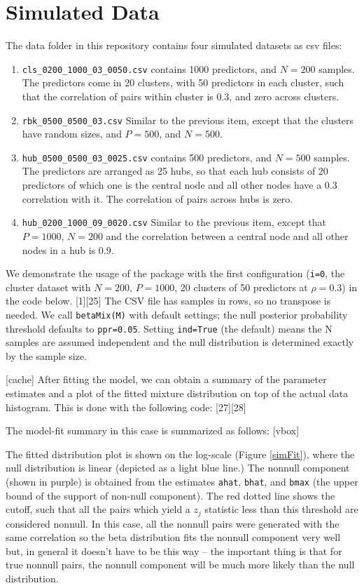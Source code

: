 \documentclass[a4paper,10pt]{article}
\begin{document}
\section{Simulated Data}
The data folder in this repository contains four simulated datasets as csv files:
\begin{enumerate}
\item \verb|cls_0200_1000_03_0050.csv|	contains 1000 predictors, and $N=200$ samples. The predictors come in 20 clusters, with 50 predictors in each cluster, such that the correlation of pairs within cluster is 0.3, and zero across clusters.
\item \verb|rbk_0500_0500_03.csv| Similar to the previous item, except that the clusters have random sizes, and $P=500$, and $N=500$.
\item \verb|hub_0500_0500_03_0025.csv| 	contains 500 predictors, and $N=500$ samples. The predictors are arranged as 25 hubs, so that each hub consists of 20 predictors of which one is the central node and all other nodes have a 0.3 correlation with it. The correlation of pairs across hubs is zero.
\item \verb|hub_0200_1000_09_0020.csv|	Similar to the previous item, except that $P=1000$, $N=200$ and the correlation between a central node and all other nodes in a hub is 0.9.
\end{enumerate}

We demonstrate the usage of the package with the first configuration (\texttt{i=0}, the cluster dataset with $N=200$, $P=1000$, 20 clusters of 50 predictors at $\rho=0.3$) in the code below.
[1][25]
The CSV file has samples in rows, so no transpose is needed.  We call \texttt{betaMix(M)} with default settings; the null posterior probability threshold defaults to \texttt{ppr=0.05}.  Setting \texttt{ind=True} (the default) means the N samples are assumed independent and the null distribution is determined exactly by the sample size.

[cache]
After fitting the model, we can obtain a summary of the parameter estimates and a plot of the fitted mixture distribution on top of the actual data histogram. This is done with the following code:
[27][28]

The model-fit summary in this case is summarized as follows:
[vbox]	

The fitted distribution plot is shown on the log-scale (Figure \ref{simFit}), where the null distribution is linear (depicted as a light blue line.) The nonnull component (shown in purple) is obtained from the estimates \texttt{ahat}, \texttt{bhat}, and \texttt{bmax} (the upper bound of the support of non-null component).  The red dotted line shows the cutoff, such that all the pairs which yield a $z_j$ statistic less than this threshold are considered nonnull. In this case, all the nonnull pairs were generated with the same correlation so the beta distribution fits the nonnull component very well but, in general it doesn't have to be this way -- the important thing is that for true nonnull pairs, the nonnull component will be much more likely than the null distribution. 
\end{document}

